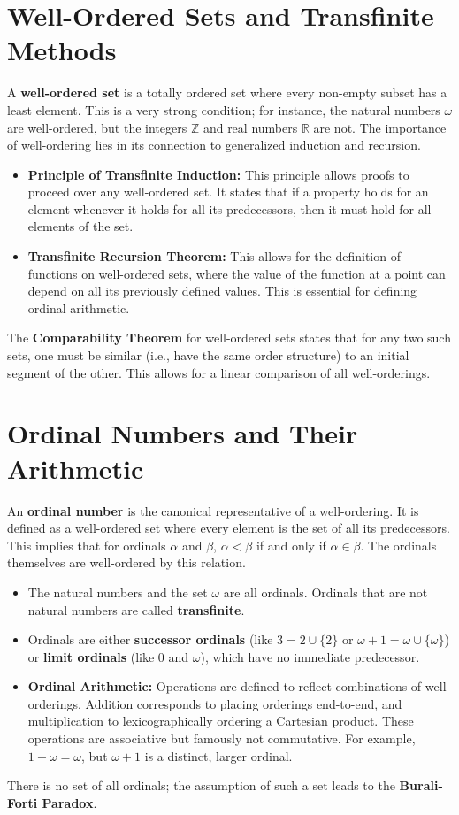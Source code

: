 \documentclass[11pt, a4paper]{article}
\begin{document}
\section{Well-Ordered Sets and Transfinite Methods}
A \textbf{well-ordered set} is a totally ordered set where every non-empty subset has a least element. This is a very strong condition; for instance, the natural numbers $\omega$ are well-ordered, but the integers $\mathbb{Z}$ and real numbers $\mathbb{R}$ are not. The importance of well-ordering lies in its connection to generalized induction and recursion.
\begin{itemize}
    \item \textbf{Principle of Transfinite Induction:} This principle allows proofs to proceed over any well-ordered set. It states that if a property holds for an element whenever it holds for all its predecessors, then it must hold for all elements of the set.
    \item \textbf{Transfinite Recursion Theorem:} This allows for the definition of functions on well-ordered sets, where the value of the function at a point can depend on all its previously defined values. This is essential for defining ordinal arithmetic.
\end{itemize}
The \textbf{Comparability Theorem} for well-ordered sets states that for any two such sets, one must be similar (i.e., have the same order structure) to an initial segment of the other. This allows for a linear comparison of all well-orderings.

\section{Ordinal Numbers and Their Arithmetic}
An \textbf{ordinal number} is the canonical representative of a well-ordering. It is defined as a well-ordered set where every element is the set of all its predecessors. This implies that for ordinals $\alpha$ and $\beta$, $\alpha < \beta$ if and only if $\alpha \in \beta$. The ordinals themselves are well-ordered by this relation.
\begin{itemize}
    \item The natural numbers and the set $\omega$ are all ordinals. Ordinals that are not natural numbers are called \textbf{transfinite}.
    \item Ordinals are either \textbf{successor ordinals} (like $3 = 2 \cup \{2\}$ or $\omega+1 = \omega \cup \{\omega\}$) or \textbf{limit ordinals} (like $0$ and $\omega$), which have no immediate predecessor.
    \item \textbf{Ordinal Arithmetic:} Operations are defined to reflect combinations of well-orderings. Addition corresponds to placing orderings end-to-end, and multiplication to lexicographically ordering a Cartesian product. These operations are associative but famously not commutative. For example, $1 + \omega = \omega$, but $\omega + 1$ is a distinct, larger ordinal.
\end{itemize}
There is no set of all ordinals; the assumption of such a set leads to the \textbf{Burali-Forti Paradox}.
\end{document}
